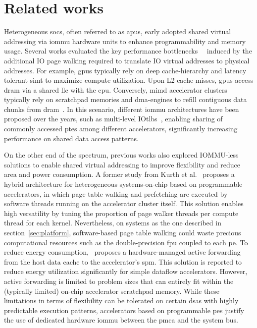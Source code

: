 \section{Related works}
Heterogeneous \glspl{soc}, often referred to as \glspl{apu}, early adopted shared virtual addressing via \gls{iommu} hardware units to enhance programmability and memory usage. Several works evaluated the key performance bottlenecks~\cite{amd_benchmarking_2016}~\cite{host_congestion_2022} induced by the additional IO page walking required to translate IO virtual addresses to physical addresses. For example, \glspl{gpu} typically rely on deep cache-hierarchy and latency tolerant \gls{simt} to maximize compute utilization. Upon L2-cache misses, \glspl{gpu} access \gls{dram} via a shared \gls{llc} with the \gls{cpu}. Conversely, \gls{mimd} accelerator clusters typically rely on scratchpad memories and \gls{dma}-engines to refill contiguous data chunks from \gls{dram}~\cite{hero_archi_2018}. In this scenario, different \gls{iommu} architectures have been proposed over the years, such as multi-level IO\glspl{tlb}~\cite{multi_lvl_tlb_2017}, enabling sharing of commonly accessed \glspl{pte} among different accelerators, significantly increasing performance on shared data access patterns.

On the other end of the spectrum, previous works also explored IOMMU-less solutions to enable shared virtual addressing to improve flexibility and reduce area and power consumption. A former study from Kurth et al.~\cite{hero_scalable_iommu_2018} proposes a hybrid architecture for heterogeneous systems-on-chip based on programmable accelerators, in which page table walking and prefetching are executed by software threads running on the accelerator cluster itself. This solution enables high versatility by tuning the proportion of page walker threads per compute thread for each kernel. Nevertheless, on systems as the one described in section~\ref{sec:platform}, software-based page table walking could waste precious computational resources such as the double-precision \gls{fpu} coupled to each \gls{pe}. To reduce energy consumption,~\cite{active_forwarding_2018} proposes a hardware-managed active forwarding from the host data cache to the accelerator's \gls{spm}. This solution is reported to reduce energy utilization significantly for simple dataflow accelerators. However, active forwarding is limited to problem sizes that can entirely fit within the (typically limited) on-chip accelerator scratchpad memory. While these limitations in terms of flexibility can be tolerated on certain \glspl{dsa} with highly predictable execution patterns, accelerators based on programmable \glspl{pe} justify the use of dedicated hardware \gls{iommu} between the \gls{pmca} and the system bus.

